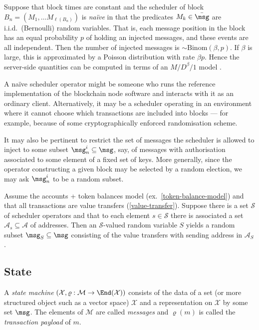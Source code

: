 \documentclass[a4paper,11pt]{article}
\begin{document}
\begin{example}
\label{naive-scheduler}

  Suppose that block times are constant and the scheduler of block $B_n=(M_1,\ldots M_{\ell(B_n)})$ is \emph{na\"ive} in that the predicates $M_k\in \bar\msg$ are i.i.d.~(Bernoulli) random variables.
  That is, each message position in the block has an equal probability $p$ of holding an injected messages, and these events are all independent.
  Then the number of injected messages is $\sim\mathrm{Binom}(\beta,p)$.
  If $\beta$ is large, this is approximated by a Poisson distribution with rate $\beta p$.
  Hence the server-side quantities can be computed in terms of an $M/D^\beta/1$ model \cite{bailey1954queueing}.
  
  A na\"ive scheduler operator might be someone who runs the reference implementation of the blockchain node software and interacts with it as an ordinary client.
  Alternatively, it may be a scheduler operating in an environment where it cannot choose which transactions are included into blocks --- for example, because of some cryptographically enforced randomisation scheme.
  
\end{example}

It may also be pertinent to restrict the set of messages the scheduler is allowed to inject to some subset $\msg_n^i\subseteq\msg$, say, of messages with authorisation associated to some element of a fixed set of keys.
%
More generally, since the operator constructing a given block may be selected by a random election, we may ask $\msg_n^i$ to be a random subset.

\begin{example}

  Assume the accounts + token balances model (ex.~\ref{token-balance-model}) and that all transactions are value transfers (\ref{value-transfer}). Suppose there is a set $\mathcal{S}$ of scheduler operators and that to each element $s\in \mathcal{S}$ there is associated a set $\mathcal{A}_s\subseteq\mathcal{A}$ of addresses.
  Then an $\mathcal{S}$-valued random variable $S$ yields a random subset $\msg_S\subseteq \msg$ consisting of the value transfers with sending address in $\mathcal{A}_S$.
  
\end{example}

\subsection{State} 
A \emph{state machine} $(\mathcal{X},\varrho:\mathcal{M}\rightarrow\End(\mathcal{X}))$ consists of the data of a set (or more structured object such as a vector space) $\mathcal{X}$ and a representation on $\mathcal{X}$ by some set $\msg$. 
%
The elements of $\mathcal{M}$ are called \emph{messages} and $\varrho(m)$ is called the \emph{transaction payload} of $m$. 
\end{document}
